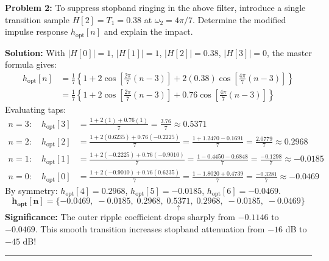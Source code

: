 \documentclass[11pt,a4paper]{article}
\begin{document}
\textbf{Problem 2:} To suppress stopband ringing in the above filter, introduce a single transition sample $H[2] = T_1 = 0.38$ at $\omega_2 = 4\pi/7$. Determine the modified impulse response $h_{\text{opt}}[n]$ and explain the impact.

\vspace{1mm}
\noindent\textbf{Solution:}
With $|H[0]| = 1$, $|H[1]| = 1$, $|H[2]| = 0.38$, $|H[3]| = 0$, the master formula gives:
\begin{align}
h_{\text{opt}}[n] &= \frac{1}{7} \left\{ 1 + 2\cos\left[\frac{2\pi}{7}(n-3)\right] + 2(0.38)\cos\left[\frac{4\pi}{7}(n-3)\right] \right\} \nonumber \\
&= \frac{1}{7} \left\{ 1 + 2\cos\left[\frac{2\pi}{7}(n-3)\right] + 0.76\cos\left[\frac{4\pi}{7}(n-3)\right] \right\}
\end{align}
Evaluating taps:
\begin{align}
n = 3: \quad h_{\text{opt}}[3] &= \frac{1 + 2(1) + 0.76(1)}{7} = \frac{3.76}{7} \approx \mathbf{0.5371} \nonumber \\
n = 2: \quad h_{\text{opt}}[2] &= \frac{1 + 2(0.6235) + 0.76(-0.2225)}{7} = \frac{1 + 1.2470 - 0.1691}{7} = \frac{2.0779}{7} \approx \mathbf{0.2968} \nonumber \\
n = 1: \quad h_{\text{opt}}[1] &= \frac{1 + 2(-0.2225) + 0.76(-0.9010)}{7} = \frac{1 - 0.4450 - 0.6848}{7} = \frac{-0.1298}{7} \approx \mathbf{-0.0185} \nonumber \\
n = 0: \quad h_{\text{opt}}[0] &= \frac{1 + 2(-0.9010) + 0.76(0.6235)}{7} = \frac{1 - 1.8020 + 0.4739}{7} = \frac{-0.3281}{7} \approx \mathbf{-0.0469}
\end{align}
By symmetry: $h_{\text{opt}}[4] = 0.2968$, $h_{\text{opt}}[5] = -0.0185$, $h_{\text{opt}}[6] = -0.0469$.
\begin{equation}
\mathbf{h_{\text{opt}}[n] = \{-0.0469, \; -0.0185, \; 0.2968, \; \underset{\uparrow}{0.5371}, \; 0.2968, \; -0.0185, \; -0.0469\}}
\end{equation}
\textbf{Significance:} The outer ripple coefficient drops sharply from $-0.1146$ to $-0.0469$. This smooth transition increases stopband attenuation from $-16$ dB to $-45$ dB!

\noindent\rule{\textwidth}{0.5pt}
\end{document}
